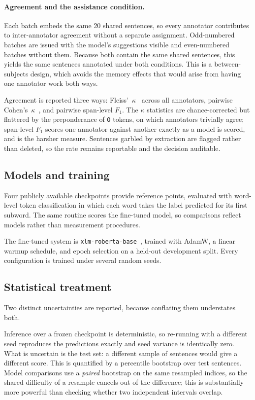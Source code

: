 \paragraph{Agreement and the assistance condition.}
Each batch embeds the same 20 shared sentences, so every annotator contributes to inter-annotator agreement without a separate assignment. Odd-numbered batches are issued with the model's suggestions visible and even-numbered batches without them. Because both contain the same shared sentences, this yields the same sentences annotated under both conditions. This is a between-subjects design, which avoids the memory effects that would arise from having one annotator work both ways.

Agreement is reported three ways: Fleiss'~$\kappa$~\cite{bib:fleiss1971} across all annotators, pairwise Cohen's~$\kappa$~\cite{bib:cohen1960}, and pairwise span-level $F_1$. The $\kappa$ statistics are chance-corrected but flattered by the preponderance of \texttt{O} tokens, on which annotators trivially agree; span-level $F_1$ scores one annotator against another exactly as a model is scored, and is the harsher measure. Sentences garbled by extraction are flagged rather than deleted, so the rate remains reportable and the decision auditable.

\subsection{Models and training}
\label{sec:method:models}

Four publicly available checkpoints provide reference points, evaluated with word-level token classification in which each word takes the label predicted for its first subword. The same routine scores the fine-tuned model, so comparisons reflect models rather than measurement procedures. 

The fine-tuned system is \texttt{xlm-roberta-base}~\cite{bib:xlmr}, trained with AdamW, a linear warmup schedule, and epoch selection on a held-out development split. Every configuration is trained under several random seeds.

\subsection{Statistical treatment}
\label{sec:method:stats}

Two distinct uncertainties are reported, because conflating them understates both.

Inference over a frozen checkpoint is deterministic, so re-running with a different seed reproduces the predictions exactly and seed variance is identically zero. What is uncertain is the test set: a different sample of sentences would give a different score. This is quantified by a percentile bootstrap over test sentences. Model comparisons use a \emph{paired} bootstrap on the same resampled indices, so the shared difficulty of a resample cancels out of the difference; this is substantially more powerful than checking whether two independent intervals overlap.

